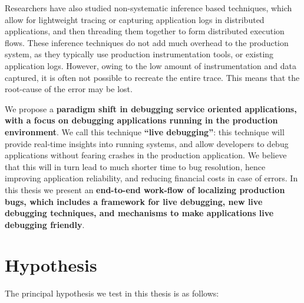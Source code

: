 Researchers have also studied non-systematic inference based techniques, which allow for lightweight tracing or capturing application logs in distributed applications, and then threading them together to form distributed execution flows.
These inference techniques do not add much overhead to the production system, as they typically use production instrumentation tools, or existing application logs.
However, owing to the low amount of instrumentation and data captured, it is often not possible to recreate the entire trace.
This means that the root-cause of the error may be lost.

We propose a \textbf{ paradigm shift in debugging service oriented applications, with a focus on debugging applications running in the production environment}.
We call this technique \textbf{``live debugging''}: this technique will provide real-time insights into running systems, and allow developers to debug applications without fearing crashes in the production application.
We believe that this will in turn lead to much shorter time to bug resolution, hence improving application reliability, and reducing financial costs in case of errors.
In this thesis we present an \textbf{end-to-end work-flow of localizing production bugs, which includes a framework for live debugging, new live debugging techniques, and mechanisms to make applications live debugging friendly}.\\


\section{Hypothesis}
\label{sec:introHypothesis}

\noindent The principal hypothesis we test in this thesis is as follows:\\

